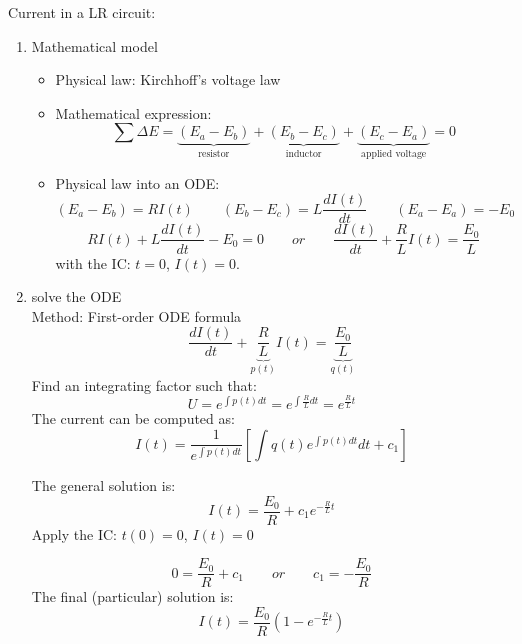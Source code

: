 \begin{exmp}{Current in a LR circuit:}
\begin{enumerate}
\item {Mathematical model}\\
\begin{itemize}
\item Physical law: Kirchhoff's voltage law
\item Mathematical expression: 
\begin{equation*}
\sum  \Delta E = \underbrace{(E_a-E_b)}_{\text{resistor}} +  \underbrace{(E_b-E_c)}_{\text{inductor}}+ \underbrace{(E_c-E_a)}_{\text{applied voltage}}=0
\end{equation*}
\item Physical law into an ODE:
\begin{equation*}
(E_a-E_b) = RI(t)\qquad (E_b-E_c)=L\frac{dI(t)}{dt}\qquad (E_a-E_a)=-E_0
\end{equation*}
\begin{equation*}
RI(t)+L\frac{dI(t)}{dt}-E_0=0 \qquad or \qquad \frac{dI(t)}{dt}+\frac{R}{L}I(t)=\frac{E_0}{L}
\end{equation*}
with the IC: $t=0$, $I(t)=0$.
\end{itemize}
\item {solve the ODE}\\
Method: First-order ODE formula\\
\begin{equation*}
 \frac{dI(t)}{dt}+\underbrace{\frac{R}{L}}_{p(t)}I(t)=\underbrace{\frac{E_0}{L}}_{q(t)}
\end{equation*}
Find an integrating factor such that:
\begin{equation*}
 U=e^{\int p(t) dt}=e^{\int \frac{R}{L} dt}=e^{\frac{R}{L}t}
 \end{equation*}
The current can be computed as:
\begin{equation*}
 I(t)=\frac{1}{e^{\int p(t) dt}}\left[\int q(t)e^{\int p(t) dt} dt+c_1\right]
 \end{equation*}\par


The general solution is:
\begin{equation*}
 \boxed{I(t)=\frac{E_0}{R}+c_1e^{-\frac{R}{L}t}}
\end{equation*}
Apply the IC: $t(0)=0$, $I(t)=0$

\begin{equation*}
0=\frac{E_0}{R}+c_1\qquad or \qquad c_1=-\frac{E_0}{R}
\end{equation*}
The final (particular) solution is:
\begin{equation*}
 \boxed{I(t)=\frac{E_0}{R}\left(1-e^{-\frac{R}{L}t}\right)}
\end{equation*}


\end{enumerate}
\end{exmp}
